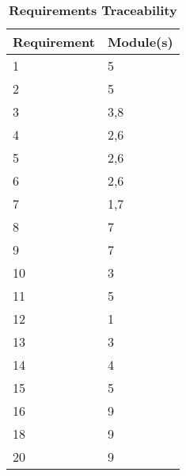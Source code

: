 \documentclass[12pt, titlepage]{article}
\begin{document}
\begin{table}[h]
\caption{\bf Requirements Traceability} \label{tab:reqtrace}
\centering
\begin{tabularx}{0.7\textwidth}{p{4cm}X}
\toprule {\bf Requirement} & {\bf Module(s)}\\
\midrule
1	&	5 \\
2	&	5\\
3	&	3,8\\
4	&	2,6\\
5      &	2,6\\
6	&	2,6\\
7	&	1,7\\
8 	&	7\\
9	&      7\\
10 	&	3\\
11	&	5\\
12	&	1\\
13	&	3\\
14	&	4\\
15	&	5\\
16	&	9\\
18	&	9\\
20	&	9\\


\bottomrule
\end{tabularx}
\end{table}
\end{document}
